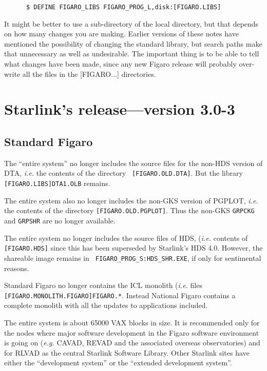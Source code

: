 \begin{verbatim}
      $ DEFINE FIGARO_LIBS FIGARO_PROG_L,disk:[FIGARO.LIBS]
\end{verbatim}

It might be better to use a sub-directory of the local directory, but that 
depends on how many changes you are making. Earlier versions of these
notes have mentioned the possibility of changing the standard library, but
search paths make that unnecessary as well as undesirable. The important thing
is to be able to tell what changes have been made, since any new Figaro
release will probably over-write all the files in the [FIGARO...] directories.

\section{Starlink's release---version 3.0-3}
\label{Starnotes}

\subsection{Standard Figaro}

The ``entire system'' no longer includes the source files for the non-HDS
version of DTA, {\em i.e.\/} the contents of the directory {\tt
[FIGARO.\-OLD.DTA]}. But the library {\tt [FIGARO.LIBS]DTA1.OLB} remains.

The entire system also no longer includes the non-GKS version of PGPLOT, {\em
i.e.\/} the contents of the directory {\tt [FIGARO.\-OLD.PGPLOT]}. Thus the
non-GKS {\tt GRPCKG} and {\tt GRPSHR} are no longer available.

The entire system no longer includes the source files of HDS, ({\em i.e.\/}
contents of {\tt [FIGARO.HDS]} since this has been superseded by Starlink's HDS
4.0. However, the shareable image remains in {\tt
FIGARO\_\-PROG\_S:\-HDS\_SHR.EXE}, if only for sentimental reasons.

Standard Figaro no longer contains the ICL monolith ({\em i.e.\/} files {\tt
[FIGARO.\-MONOLITH.\-FIGARO]\-FIGARO.*}. Instead National Figaro contains a
complete monolith with all the updates to applications included.

The entire system is about 65000 VAX blocks in size. It is recommended only for
the nodes where major software development in the Figaro software environment
is going on ({\em e.g.\/} CAVAD, REVAD and the associated overseas
observatories) and for RLVAD as the central Starlink Software Library. Other
Starlink sites have either the ``development system'' or the ``extended
development system''.

